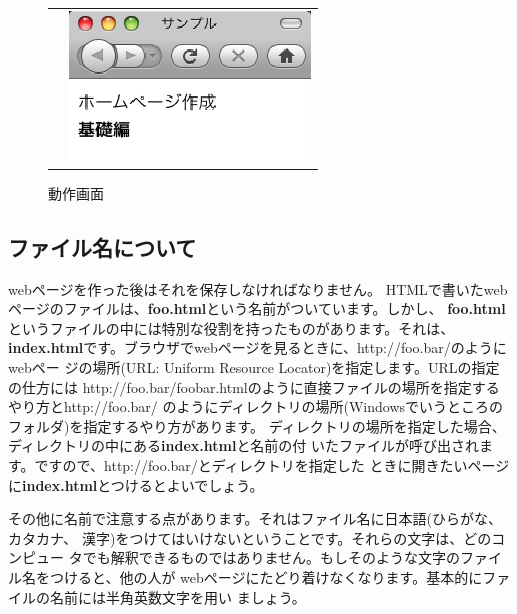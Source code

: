 \documentclass[12pt, a4j]{jsarticle}
\begin{document}
\begin{figure}[htbp]
\begin{tabular}{cc}
\begin{minipage}{0.5\hsize}
\begin{center}

\end{center}
\end{minipage}
&
\begin{minipage}{0.5\hsize}
\begin{center}
\includegraphics[width=0.8\linewidth]{sample.eps}
\caption{動作画面}
\end{center}
\end{minipage}
\end{tabular}
\end{figure}

\subsection{ファイル名について}

webページを作った後はそれを保存しなければなりません。
HTMLで書いたwebページのファイルは、{\bf \sf foo.html}という名前がついています。しかし、
{\bf \sf foo.html}というファイルの中には特別な役割を持ったものがあります。それは、
{\bf \sf index.html}です。ブラウザでwebページを見るときに、http://foo.bar/のようにwebペー
ジの場所(URL: Uniform Resource Locator)を指定します。URLの指定の仕方には
http://foo.bar/foobar.htmlのように直接ファイルの場所を指定するやり方とhttp://foo.bar/
のようにディレクトリの場所(Windowsでいうところのフォルダ)を指定するやり方があります。
ディレクトリの場所を指定した場合、ディレクトリの中にある{\bf \sf index.html}と名前の付
いたファイルが呼び出されます。ですので、http://foo.bar/とディレクトリを指定した
ときに開きたいページに{\bf \sf index.html}とつけるとよいでしょう。

その他に名前で注意する点があります。それはファイル名に日本語(ひらがな、カタカナ、
漢字)をつけてはいけないということです。それらの文字は、どのコンピュー
タでも解釈できるものではありません。もしそのような文字のファイル名をつけると、他の人が
webページにたどり着けなくなります。基本的にファイルの名前には半角英数文字を用い
ましょう。
\end{document}

